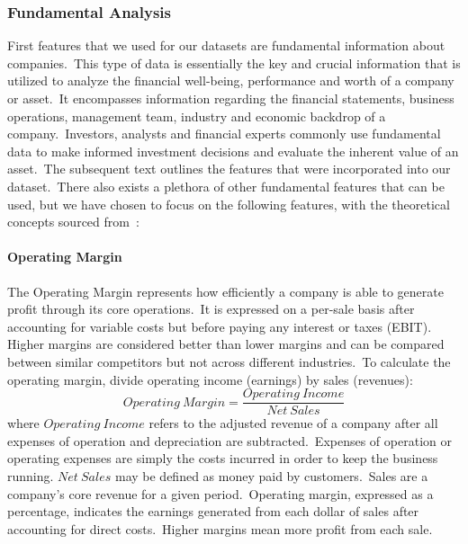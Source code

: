 \documentclass[../xlapes02]{subfiles}
\begin{document}
    \subsubsection{Fundamental Analysis}\label{subsubsec:fundamental-analysis}
    First features that we used for our datasets are fundamental information about companies.\ This type of data is essentially the key and crucial information that is utilized to analyze the financial well-being, performance and worth of a company or asset.\ It encompasses information regarding the financial statements, business operations, management team, industry and economic backdrop of a company.\ Investors, analysts and financial experts commonly use fundamental data to make informed investment decisions and evaluate the inherent value of an asset.\ The subsequent text outlines the features that were incorporated into our dataset.\ There also exists a plethora of other fundamental features that can be used, but we have chosen to focus on the following features, with the theoretical concepts sourced from~\cite{investopedia}:

    \paragraph{Operating Margin}\label{par:operating-margin}
    The Operating Margin represents how efficiently a company is able to generate profit through its core operations.\ It is expressed on a per-sale basis after accounting for variable costs but before paying any interest or taxes (EBIT). Higher margins are considered better than lower margins and can be compared between similar competitors but not across different industries.\ To calculate the operating margin, divide operating income (earnings) by sales (revenues):
    \begin{equation}
        \label{eq:operating-margin}
        Operating\ Margin=\frac{Operating\ Income}{Net\ Sales}
    \end{equation}
    where $Operating\ Income$ refers to the adjusted revenue of a company after all expenses of operation and depreciation are subtracted.\ Expenses of operation or operating expenses are simply the costs incurred in order to keep the business running. $Net\ Sales$ may be defined as money paid by customers.\ Sales are a company's core revenue for a given period.\ Operating margin, expressed as a percentage, indicates the earnings generated from each dollar of sales after accounting for direct costs.\ Higher margins mean more profit from each sale.
\end{document}
